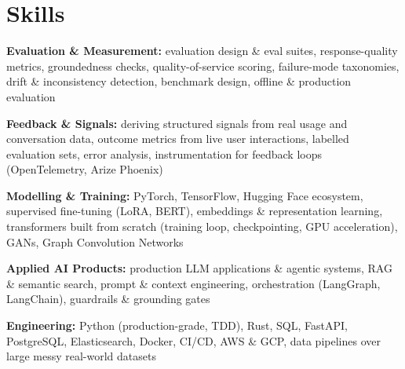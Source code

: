 \documentclass[10pt,a4paper]{article}
\begin{document}
\section{Skills}
\begin{tight}
  \item[\textcolor{accent}{\small$\bullet$}] \textbf{Evaluation \& Measurement:} evaluation design \& eval suites, response-quality metrics, groundedness checks, quality-of-service scoring, failure-mode taxonomies, drift \& inconsistency detection, benchmark design, offline \& production evaluation
  \item[\textcolor{accent}{\small$\bullet$}] \textbf{Feedback \& Signals:} deriving structured signals from real usage and conversation data, outcome metrics from live user interactions, labelled evaluation sets, error analysis, instrumentation for feedback loops (OpenTelemetry, Arize Phoenix)
  \item[\textcolor{accent}{\small$\bullet$}] \textbf{Modelling \& Training:} PyTorch, TensorFlow, Hugging Face ecosystem, supervised fine-tuning (LoRA, BERT), embeddings \& representation learning, transformers built from scratch (training loop, checkpointing, GPU acceleration), GANs, Graph Convolution Networks
  \item[\textcolor{accent}{\small$\bullet$}] \textbf{Applied AI Products:} production LLM applications \& agentic systems, RAG \& semantic search, prompt \& context engineering, orchestration (LangGraph, LangChain), guardrails \& grounding gates
  \item[\textcolor{accent}{\small$\bullet$}] \textbf{Engineering:} Python (production-grade, TDD), Rust, SQL, FastAPI, PostgreSQL, Elasticsearch, Docker, CI/CD, AWS \& GCP, data pipelines over large messy real-world datasets
\end{tight}

\end{document}
